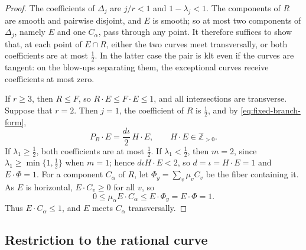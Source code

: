 \documentclass[11pt,reqno]{amsart}
\numberwithin{equation}{section}
\theoremstyle{remark}
\begin{document}
\begin{proof}
The coefficients of \(\Delta_j\) are \(j/r<1\) and \(1-\lambda_j<1\). The components of \(R\) are smooth and pairwise disjoint, and \(E\) is smooth; so at most two components of \(\Delta_j\), namely \(E\) and one \(C_\alpha\), pass through any point. It therefore suffices to show that, at each point of \(E\cap R\), either the two curves meet transversally, or both coefficients are at most \(\frac12\). In the latter case the pair is klt even if the curves are tangent: on the blow-ups separating them, the exceptional curves receive coefficients at most zero.

If \(r\geq3\), then \(R\leq F\), so \(R\cdot E\leq F\cdot E\leq1\), and all intersections are transverse. Suppose that \(r=2\). Then \(j=1\), the coefficient of \(R\) is \(\frac12\), and by \eqref{eq:fixed-branch-form},
\[
 P_B\cdot E=\frac{d\iota}{2}\,H\cdot E,\qquad H\cdot E\in\mathbb Z_{>0}.
\]
If \(\lambda_1\geq\frac12\), both coefficients are at most \(\frac12\). If \(\lambda_1<\frac12\), then \(m=2\), since \(\lambda_1\geq\min\{1,\frac12\}\) when \(m=1\); hence \(d\iota H\cdot E<2\), so \(d=\iota=H\cdot E=1\) and \(E\cdot\Phi=1\). For a component \(C_\alpha\) of \(R\), let \(\Phi_y=\sum_v\mu_vC_v\) be the fiber containing it. As \(E\) is horizontal, \(E\cdot C_v\geq0\) for all \(v\), so
\[
 0\leq\mu_\alpha E\cdot C_\alpha\leq E\cdot\Phi_y=E\cdot\Phi=1.
\]
Thus \(E\cdot C_\alpha\leq1\), and \(E\) meets \(C_\alpha\) transversally.
\end{proof}

\subsection{Restriction to the rational curve}\label{sec:fixed-proof}
\end{document}
